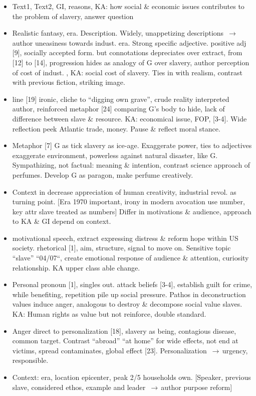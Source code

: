 \documentclass[a4paper,12pt]{article}
\newcommand{\arr}{$\,\to\,$}
\begin{document}
\begin{itemize}
 \item Text1, Text2, GI, reasons, KA: how social \& economic issues contributes to the problem of slavery, answer question
 \item Realistic fantasy, era. Description. Widely, unappetizing descriptions \arr author uneasiness towards indust. era.
 Strong specific adjective. positive adj [9], socially accepted form. but connotations depreciates over extract, from [12] to [14], progression hides as analogy of G over slavery, author perception of cost of indust. , KA: social cost of slavery. Ties in with realism, contrast with previous fiction, striking image.
 \item line [19] ironic, cliche to ``digging own grave'', crude reality interpreted author, reinforced metaphor [24] comparing G's body to hide, lack of difference between slave \& resource. KA: economical issue, FOP, [3-4]. Wide reflection peek Atlantic trade, money. Pause \& reflect moral stance.
 \item Metaphor [7] G as tick slavery as ice-age. Exaggerate power, ties to adjectives exaggerate environment, powerless against natural disaster, like G. Sympathizing, not factual: meaning \& intention, contrast science approach of perfumes. Develop G as paragon, make perfume creatively.
 \item Context in decrease appreciation of human creativity, industrial revol. as turning point. [Era 1970 important, irony in modern avocation use number, key attr slave treated as numbers] Differ in motivations \& audience, approach to KA \& GI depend on context.

 \item motivational speech, extract expressing distress \& reform hope within US society. rhetorical [1], aim, structure, signal to move on. Sensitive topic ``slave'' ``04/07``, create emotional response of audience \& attention, curiosity relationship. KA upper class able change.
 \item Personal pronoun [1], singles out. attack beliefs [3-4], establish guilt for crime, while benefiting, repetition pile up social pressure. Pathos in deconstruction values induce anger, analogous to destroy \& decompose social value slaves. KA: Human rights as value but not reinforce, double standard.
 \item Anger direct to personalization [18], slavery as being, contagious disease, common target. Contrast ``abroad'' ``at home'' for wide effects, not end at victims, spread  contaminates, global effect [23]. Personalization \arr urgency, responsible.
 \item Context: era, location epicenter, peak 2/5 households own. [Speaker, previous slave, considered ethos, example and leader \arr author purpose reform]


\end{itemize}
\end{document}
